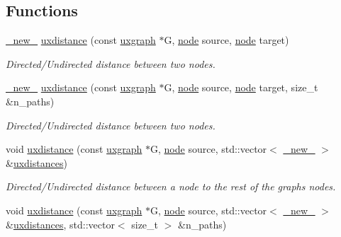 \subsection*{Functions}
\begin{DoxyCompactItemize}
\item 
\hyperlink{namespacelgraph_a2836f966c1c36b43da337d8907728ec0}{\+\_\+new\+\_\+} \hyperlink{namespacelgraph_1_1traversal_a73bb6b5984fc97e12576ca4f16344fbf}{uxdistance} (const \hyperlink{classlgraph_1_1uxgraph}{uxgraph} $\ast$G, \hyperlink{namespacelgraph_a397169dd66adf725210a30fb7251773e}{node} source, \hyperlink{namespacelgraph_a397169dd66adf725210a30fb7251773e}{node} target)
\begin{DoxyCompactList}\small\item\em Directed/\+Undirected distance between two nodes. \end{DoxyCompactList}\item 
\hyperlink{namespacelgraph_a2836f966c1c36b43da337d8907728ec0}{\+\_\+new\+\_\+} \hyperlink{namespacelgraph_1_1traversal_a084aa7ff13d10613c411ff8d4a2dc4c8}{uxdistance} (const \hyperlink{classlgraph_1_1uxgraph}{uxgraph} $\ast$G, \hyperlink{namespacelgraph_a397169dd66adf725210a30fb7251773e}{node} source, \hyperlink{namespacelgraph_a397169dd66adf725210a30fb7251773e}{node} target, size\+\_\+t \&n\+\_\+paths)
\begin{DoxyCompactList}\small\item\em Directed/\+Undirected distance between two nodes. \end{DoxyCompactList}\item 
void \hyperlink{namespacelgraph_1_1traversal_a43974cb7096893f50511d745c8993cf0}{uxdistance} (const \hyperlink{classlgraph_1_1uxgraph}{uxgraph} $\ast$G, \hyperlink{namespacelgraph_a397169dd66adf725210a30fb7251773e}{node} source, std\+::vector$<$ \hyperlink{namespacelgraph_a2836f966c1c36b43da337d8907728ec0}{\+\_\+new\+\_\+} $>$ \&\hyperlink{namespacelgraph_1_1traversal_a401cf82c5e153e82a73f4be9d5d75288}{uxdistances})
\begin{DoxyCompactList}\small\item\em Directed/\+Undirected distance between a node to the rest of the graph\textquotesingle{}s nodes. \end{DoxyCompactList}\item 
void \hyperlink{namespacelgraph_1_1traversal_a1b00d5986cab46bf5cfaad0259886a72}{uxdistance} (const \hyperlink{classlgraph_1_1uxgraph}{uxgraph} $\ast$G, \hyperlink{namespacelgraph_a397169dd66adf725210a30fb7251773e}{node} source, std\+::vector$<$ \hyperlink{namespacelgraph_a2836f966c1c36b43da337d8907728ec0}{\+\_\+new\+\_\+} $>$ \&\hyperlink{namespacelgraph_1_1traversal_a401cf82c5e153e82a73f4be9d5d75288}{uxdistances}, std\+::vector$<$ size\+\_\+t $>$ \&n\+\_\+paths)

\end{DoxyCompactItemize}
